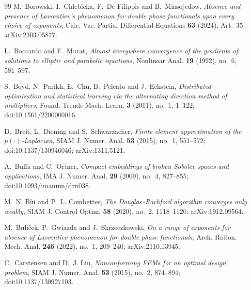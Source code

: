 \documentclass[11pt]{amsart}
\theoremstyle{definition}
\theoremstyle{remark}
\numberwithin{equation}{section}
\begin{document}
\begin{thebibliography}{99}
M.~Borowski, I.~Chlebicka, F.~De Filippis and B.~Miasojedow, \emph{Absence and presence of Lavrentiev's phenomenon for double phase functionals upon every choice of exponents}, Calc. Var. Partial Differential Equations \textbf{63} (2024), Art.~35; arXiv:2303.05877.

L.~Boccardo and F.~Murat, \emph{Almost everywhere convergence of the gradients of solutions to elliptic and parabolic equations}, Nonlinear Anal. \textbf{19} (1992), no.~6, 581--597.

S.~Boyd, N.~Parikh, E.~Chu, B.~Peleato and J.~Eckstein, \emph{Distributed optimization and statistical learning via the alternating direction method of multipliers}, Found. Trends Mach. Learn. \textbf{3} (2011), no.~1, 1--122; doi:10.1561/2200000016.

D.~Breit, L.~Diening and S.~Schwarzacher, \emph{Finite element approximation of the $p(\cdot)$-Laplacian}, SIAM J. Numer. Anal. \textbf{53} (2015), no.~1, 551--572; doi:10.1137/130946046; arXiv:1311.5121.

A.~Buffa and C.~Ortner, \emph{Compact embeddings of broken Sobolev spaces and applications}, IMA J. Numer. Anal. \textbf{29} (2009), no.~4, 827--855; doi:10.1093/imanum/drn038.

M.~N. B\`ui and P.~L. Combettes, \emph{The Douglas--Rachford algorithm converges only weakly}, SIAM J. Control Optim. \textbf{58} (2020), no.~2, 1118--1120; arXiv:1912.09564.

M.~Bul\'i\v{c}ek, P.~Gwiazda and J.~Skrzeczkowski, \emph{On a range of exponents for absence of Lavrentiev phenomenon for double phase functionals}, Arch. Ration. Mech. Anal. \textbf{246} (2022), no.~1, 209--240; arXiv:2110.13945.

C.~Carstensen and D.~J. Liu, \emph{Nonconforming FEMs for an optimal design problem}, SIAM J. Numer. Anal. \textbf{53} (2015), no.~2, 874--894; doi:10.1137/130927103.


\end{thebibliography}
\end{document}
